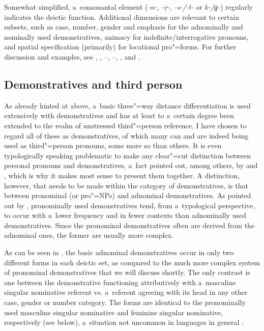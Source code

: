Somewhat simplified, a~consonantal element (\textit{-n-, -ṛ-, -s-/-t-} or \textit{k-/ɡ-}) regularly indicates the deictic function. Additional dimensions are relevant to certain subsets, such as case, number, gender and emphasis for the adnominally and nominally used demonstratives, animacy for indefinite/interrogative pronouns, and spatial specification (primarily) for locational pro"=forms. For further discussion and examples, see , , --, --, ,  and .

\subsection{Demonstratives and third person}
\label{subsec:5-2-2}


As already hinted at above, a~basic three"=way distance differentiation is used extensively with demonstratives and has at least to a~certain degree been extended to the realm of unstressed third"=person reference. I have chosen to regard all of these as demonstratives, of which many can and are indeed being used as third"=person pronouns, some more so than others. It is even typologically speaking problematic to make any clear"=cut distinction between personal pronouns and demonstratives, a~fact pointed out, among others, by \citet[206]{himmelmann1996} and \citet[123--124]{kibrik2011}, which is why it makes most sense to present them together. A distinction, however, that needs to be made within the category of demonstratives, is that between pronominal (or pro"=NPs) and adnominal demonstratives. As pointed out by \citet[206]{himmelmann1996}, pronominally used demonstratives tend, from a~typological perspective, to occur with a~lower frequency and in fewer contexts than adnominally used demonstratives. Since the pronominal demonstratives often are derived from the adnominal ones, the former are usually more complex. 



As can be seen in , the basic adnominal demonstratives occur in only two different forms in each deictic set, as compared to the much more complex system of pronominal demonstratives that we will discuss shortly. The only contrast is one between the demonstrative functioning attributively with a~masculine singular nominative referent vs. a~referent agreeing with its head in any other case, gender or number category. The forms are identical to the pronominally used masculine singular nominative and feminine singular nominative, respectively (see below), a~situation not uncommon in languages in general \citep[214]{himmelmann1996}. 


